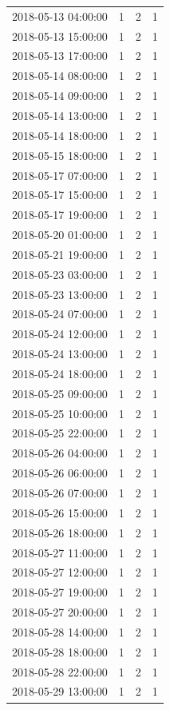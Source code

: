 \begin{tabular}{lrrr}
2018-05-13 04:00:00 & 1 & 2 & 1 \\
2018-05-13 15:00:00 & 1 & 2 & 1 \\
2018-05-13 17:00:00 & 1 & 2 & 1 \\
2018-05-14 08:00:00 & 1 & 2 & 1 \\
2018-05-14 09:00:00 & 1 & 2 & 1 \\
2018-05-14 13:00:00 & 1 & 2 & 1 \\
2018-05-14 18:00:00 & 1 & 2 & 1 \\
2018-05-15 18:00:00 & 1 & 2 & 1 \\
2018-05-17 07:00:00 & 1 & 2 & 1 \\
2018-05-17 15:00:00 & 1 & 2 & 1 \\
2018-05-17 19:00:00 & 1 & 2 & 1 \\
2018-05-20 01:00:00 & 1 & 2 & 1 \\
2018-05-21 19:00:00 & 1 & 2 & 1 \\
2018-05-23 03:00:00 & 1 & 2 & 1 \\
2018-05-23 13:00:00 & 1 & 2 & 1 \\
2018-05-24 07:00:00 & 1 & 2 & 1 \\
2018-05-24 12:00:00 & 1 & 2 & 1 \\
2018-05-24 13:00:00 & 1 & 2 & 1 \\
2018-05-24 18:00:00 & 1 & 2 & 1 \\
2018-05-25 09:00:00 & 1 & 2 & 1 \\
2018-05-25 10:00:00 & 1 & 2 & 1 \\
2018-05-25 22:00:00 & 1 & 2 & 1 \\
2018-05-26 04:00:00 & 1 & 2 & 1 \\
2018-05-26 06:00:00 & 1 & 2 & 1 \\
2018-05-26 07:00:00 & 1 & 2 & 1 \\
2018-05-26 15:00:00 & 1 & 2 & 1 \\
2018-05-26 18:00:00 & 1 & 2 & 1 \\
2018-05-27 11:00:00 & 1 & 2 & 1 \\
2018-05-27 12:00:00 & 1 & 2 & 1 \\
2018-05-27 19:00:00 & 1 & 2 & 1 \\
2018-05-27 20:00:00 & 1 & 2 & 1 \\
2018-05-28 14:00:00 & 1 & 2 & 1 \\
2018-05-28 18:00:00 & 1 & 2 & 1 \\
2018-05-28 22:00:00 & 1 & 2 & 1 \\
2018-05-29 13:00:00 & 1 & 2 & 1 \\

\end{tabular}
